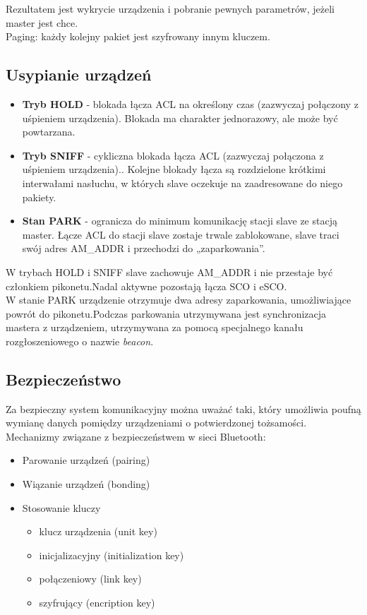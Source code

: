 Rezultatem jest wykrycie urządzenia i pobranie pewnych parametrów, jeżeli master jest chce.\\

Paging: każdy kolejny pakiet jest szyfrowany innym kluczem.

\subsection{Usypianie urządzeń}

\begin{itemize}
	\item \textbf{Tryb HOLD} - blokada łącza ACL na określony czas (zazwyczaj połączony z uśpieniem urządzenia).
	Blokada ma charakter jednorazowy, ale może być powtarzana.
	\item \textbf{Tryb SNIFF} - cykliczna blokada łącza ACL (zazwyczaj połączona z uśpieniem urządzenia)..
	Kolejne blokady łącza są rozdzielone krótkimi interwałami nasłuchu, w których slave oczekuje na zaadresowane do niego pakiety.
	\item \textbf{Stan PARK} - ogranicza do minimum komunikację stacji slave ze stacją master.
	Łącze ACL do stacji slave zostaje trwale zablokowane, slave traci swój adres AM\_ADDR i przechodzi
	do „zaparkowania”.
\end{itemize}

W trybach HOLD i SNIFF slave zachowuje AM\_ADDR i nie przestaje być członkiem pikonetu.Nadal aktywne pozostają łącza SCO i eSCO. \\
W stanie PARK urządzenie otrzymuje dwa adresy zaparkowania, umożliwiające powrót do pikonetu.Podczas parkowania utrzymywana jest synchronizacja mastera z urządzeniem, utrzymywana za pomocą
specjalnego kanału rozgłoszeniowego o nazwie \textit{beacon}.

\subsection{Bezpieczeństwo}

Za bezpieczny system komunikacyjny można uważać taki, który umożliwia poufną wymianę danych pomiędzy urządzeniami o potwierdzonej tożsamości.
Mechanizmy związane z bezpieczeństwem w sieci Bluetooth: 
\begin{itemize}
	\item Parowanie urządzeń (pairing)
	\item Wiązanie urządzeń (bonding)
	\item Stosowanie kluczy
	\begin{itemize}
		\item klucz urządzenia (unit key)
		\item inicjalizacyjny (initialization key)
		\item połączeniowy (link key)
		\item szyfrujący (encription key)
	\end{itemize}
\end{itemize}